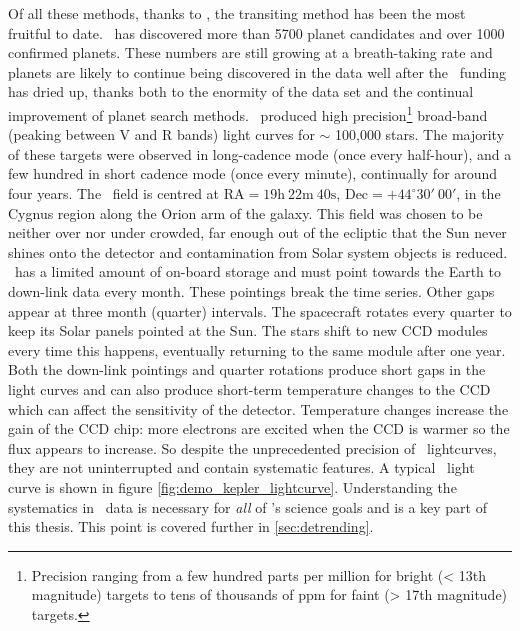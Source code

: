 Of all these methods, thanks to \kepler, the transiting method has been the
most fruitful to date.
\kepler\ has discovered more than 5700 planet candidates and over 1000
confirmed planets.
These numbers are still growing at a breath-taking rate and planets are likely
to continue being discovered in the data well after the \kepler\ funding has
dried up, thanks both to the enormity of the data set and the continual
improvement of planet search methods.
\kepler\ produced high precision\footnote{Precision ranging from a few hundred
parts per million for bright (< 13th magnitude) targets to tens of thousands
of ppm for faint (> 17th magnitude) targets.} broad-band (peaking between V
and R bands) light curves for $\sim$ 100,000 stars.
The majority of these targets were observed in long-cadence mode (once every
half-hour), and a few hundred in short cadence mode (once every minute),
continually for around four years.
The \kepler\ field is centred at $\mathrm{RA} = 19\mathrm{h}~22\mathrm{m}~
40\mathrm{s}$, $\mathrm{Dec} = +44^\circ30'~00'$, in the Cygnus region along
the Orion arm of the galaxy.
This field was chosen to be neither over nor under crowded, far enough out of
the ecliptic that the Sun never shines onto the detector and contamination
from Solar system objects is reduced.
\kepler\ has a limited amount of on-board storage and must point towards the
Earth to down-link data every month.
These pointings break the time series.
Other gaps appear at three month (quarter) intervals.
The spacecraft rotates every quarter to keep its Solar panels pointed at the
Sun.
The stars shift to new CCD modules every time this happens, eventually
returning to the same module after one year.
Both the down-link pointings and quarter rotations produce short gaps in the
light curves and can also produce short-term temperature changes to the CCD
which can affect the sensitivity of the detector.
Temperature changes increase the gain of the CCD chip: more electrons are
excited when the CCD is warmer so the flux appears to increase.
So despite the unprecedented precision of \kepler\ lightcurves, they are not
uninterrupted and contain systematic features.
A typical \kepler\ light curve is shown in figure
\ref{fig:demo_kepler_lightcurve}.
Understanding the systematics in \kepler\ data is necessary for {\it all} of
\kepler's science goals and is a key part of this thesis.
This point is covered further in \textsection \ref{sec:detrending}.

